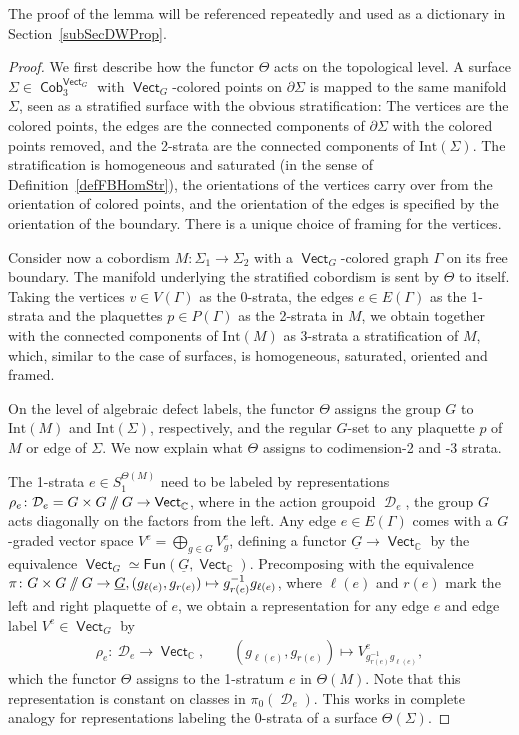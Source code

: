 \documentclass[pdftex]{sigma}
\DeclareMathOperator{\vect}{\mathsf{Vect}}
\DeclareMathOperator{\C}{\mathbb{C}}
\DeclareMathOperator{\Cob}{\mathsf{Cob}}
\DeclareMathOperator{\cald}{\mathcal{D}}
\newcommand{\sslash}{\mathbin{/\mkern-6mu/}}
\numberwithin{equation}{section}
\theoremstyle{definition}
\begin{document}
The proof of the lemma will be referenced repeatedly and used as a dictionary in Section~\ref{subSecDWProp}.
\begin{proof}
 We first describe how the functor $\Theta$ acts on the topological level. A surface $\Sigma \in \Cob_3^{\vect_G}$ with $\vect_G$-colored points on $\partial \Sigma$ is mapped to the same manifold $\Sigma$, seen as a stratified surface with the obvious stratification: The vertices are the colored points, the edges are the connected components of $\partial \Sigma$ with the colored points removed, and the 2-strata are the connected components of $\mathrm{Int}(\Sigma)$. The stratification is homogeneous and saturated (in the sense of Definition~\ref{defFBHomStr}), the orientations of the vertices carry over from the orientation of colored points, and the orientation of the edges is specified by the orientation of the boundary. There is a unique choice of framing for the vertices.

 Consider now a cobordism $M\colon \Sigma_1 \rightarrow \Sigma_2$ with a $\vect_G$-colored graph $\Gamma$ on its free boundary. The manifold underlying the stratified cobordism is sent by $\Theta$ to itself. Taking the vertices $v \in V(\Gamma)$ as the 0-strata, the edges $e \in E(\Gamma)$ as the 1-strata and the plaquettes $p \in P(\Gamma)$ as the 2-strata in $M$, we obtain together with the connected components of $\mathrm{Int}(M)$ as 3-strata a stratification of $M$, which, similar to the case of surfaces, is homogeneous, saturated, oriented and framed.

 On the level of algebraic defect labels, the functor $\Theta$ assigns the group $G$ to $\mathrm{Int}(M)$ and $\mathrm{Int}(\Sigma)$, respectively, and the regular $G$-set to any plaquette $p$ of $M$ or edge of $\Sigma$. We now explain what $\Theta$ assigns to codimension-2 and -3 strata.

 The 1-strata $e \in S_1^{\Theta(M)}$ need to be labeled by representations $\rho_e\colon \mathcal{D}_e = G \times G \sslash G \rightarrow \vect_{\C}$, where in the action groupoid $\cald_e$, the group $G$ acts diagonally on the factors from the left. Any edge $e \in E(\Gamma)$ comes with a $G$-graded vector space $V^e = \bigoplus_{g \in G}V_g^e$, defining a functor $\underline{G} \rightarrow \vect_{\C}$ by the equivalence $\vect_G \simeq \mathsf{Fun}\left(\underline{G}, \vect_{\C}\right)$. Precomposing with the equivalence $\pi\colon G \times G \sslash G \rightarrow \underline{G}, (g_{\ell(e)}, g_{r(e)}) \mapsto g_{r(e)}^{-1}g_{\ell(e)}$, where $\ell(e)$ and $r(e)$ mark the left and right plaquette of $e$, we obtain a representation for any edge $e$ and edge label $V^e \in \vect_G$ by
 \begin{align*}
 \rho_e\colon \ \mathcal{D}_e \rightarrow \vect_{\C}, \qquad (g_{\ell(e)}, g_{r(e)}) \mapsto V_{g_{r(e)}^{-1}g_{\ell(e)}}^e,
 \end{align*}
 which the functor $\Theta$ assigns to the 1-stratum $e$ in $\Theta(M)$. Note that this representation is constant on classes in $\pi_0(\cald_e)$. This works in complete analogy for representations labeling the 0-strata of a surface $\Theta(\Sigma)$.


\end{proof}
\end{document}
